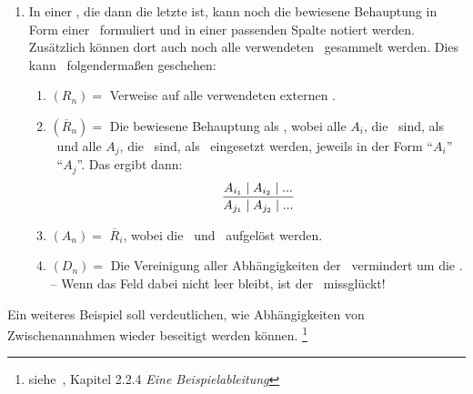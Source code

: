 {\begin{enumerate}
	Nun kann die Zeile beendet werden, oder es geht weiter mit:
	\begin{enumerate}
		\setcounter{enumii}{\value{Enumii}}%
		\item \label{item:Anwendung} $Z_n =$ Die Indizes aller $A_j$ (mit $j < i$), die eine \Voraussetzung\ der \Schlussregel\ $\overline{R}_i$ sind, möglichst in der verwendeten Reihenfolge.
		-- Für jedes angegebene $j$ werden noch die Abhängigkeiten $D_j$ den Abhängigkeiten $D_i$ hinzugefügt.
		\item $A_i =$ \Folgerung(en) der \Schlussregel\ $\overline{R}_i$.
		-- Wenn diese \Folgerungen\ schon als \Aussagen\ $A_j$ (mit $j < i$) vorhanden sind, können auch einfach deren Indizes eingetragen werden.
		Damit werden die Zusammenhänge und der Abschluss des \Beweises\ besser ersichtlich.
		\item $D_i =$ Die Verweise wurden schon in (\ref{item:Anwendung}) eingetragen.%
		\footnote{Wenn $D_n$ leer ist, dann ist $A_n$ allgemeingültig.}
	\end{enumerate}
	Der \Beweis\ muss so lange fortgeführt werden, bis alle \Folgerungen\ als \Aussagen\ in der Spalte $(A_n)$ erschienen und dort jeweils nur von den gegebenen \Voraussetzungen\ abhängig sind.
	\item \label{item:Ergebniszeile} In einer , die dann die letzte ist, kann noch die bewiesene Behauptung in Form einer \Schlussregel\ formuliert und in einer passenden Spalte notiert werden.
	Zusätzlich können dort auch noch alle verwendeten \Schlussregeln\ gesammelt werden.
	Dies kann \textzB\ folgendermaßen geschehen:
	\begin{enumerate}
		\item $(R_n) =$ Verweise auf alle verwendeten externen \Schlussregeln.
		\item $(\overline{R}_n) =$ Die bewiesene Behauptung als \Schlussregeln, wobei alle $A_i$, die \Voraussetzungen\ sind, als \Voraussetzung\ und alle $A_j$, die \Folgerungen\ sind, als \Folgerung\ eingesetzt werden, jeweils in der Form \enquote{$A_i$} \textbzgl\ \enquote{$A_j$}.
		Das ergibt dann:
		\[ \frac{A_{i_1} \mid A_{i_2} \mid ...}{A_{j_1} \mid A_{j_2} \mid ...} \]
		\item $(A_n) =$ $\overline{R}_i$, wobei die \Voraussetzungen\ und \Folgerungen\ aufgelöst werden.
		\item $(D_n) =$ Die Vereinigung aller Abhängigkeiten der \Folgerungen\, vermindert um die \Voraussetzungen.
		-- Wenn das Feld dabei nicht leer bleibt, ist der \Beweis\ missglückt!
	\end{enumerate}
\end{enumerate}
%
Ein weiteres Beispiel  soll verdeutlichen, wie Abhängigkeiten von Zwischenannahmen wieder beseitigt werden können.%
\footnote{siehe~\cite{bib:NatuerlichesSchliessen},
Kapitel 2.2.4 \emph{Eine Beispielableitung}}

}
